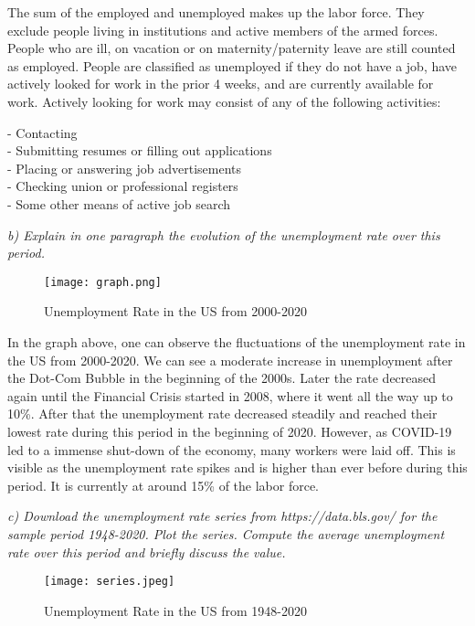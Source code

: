 \documentclass[11pt]{article} %
\begin{document}
The sum of the employed and unemployed makes up the labor force. They exclude people living in institutions and active members of the armed forces. People who are ill, on vacation or on maternity/paternity leave are still counted as employed. People are classified as unemployed if they do not have a job, have actively looked for work in the prior 4 weeks, and are currently available for work. Actively looking for work may consist of any of the following activities:\par
- Contacting\\
- Submitting resumes or filling out applications\\
- Placing or answering job advertisements\\
- Checking union or professional registers\\
- Some other means of active job search\par




\pagebreak
\textit{b) Explain in one paragraph the evolution of the unemployment rate over
this period.}\par 

\begin{figure}[h!]
\caption{Unemployment Rate in the US from 2000-2020}
\centering
\label{figure1}
\texttt{[image: graph.png]}
\end{figure}

In the graph above, one can observe the fluctuations of the unemployment rate in the US from 2000-2020. We can see a moderate increase in unemployment after the Dot-Com Bubble in the beginning of the 2000s. Later the rate decreased again until the Financial Crisis started in 2008, where it went all the way up to 10\%. After that the unemployment rate decreased steadily and reached their lowest rate during this period in the beginning of 2020. However, as COVID-19 led to a immense shut-down of the economy, many workers were laid off. This is visible as the unemployment rate spikes and is higher than ever before during this period. It is currently at around 15\% of the labor force.




\pagebreak
\textit{c) Download the unemployment rate series from https://data.bls.gov/ for
the sample period 1948-2020. Plot the series. Compute the average
unemployment rate over this period and briefly discuss the value.}\par 

\begin{figure}[h!]
\caption{Unemployment Rate in the US from 1948-2020}
\centering
\label{figure1}
\texttt{[image: series.jpeg]}
\end{figure}
\end{document}
